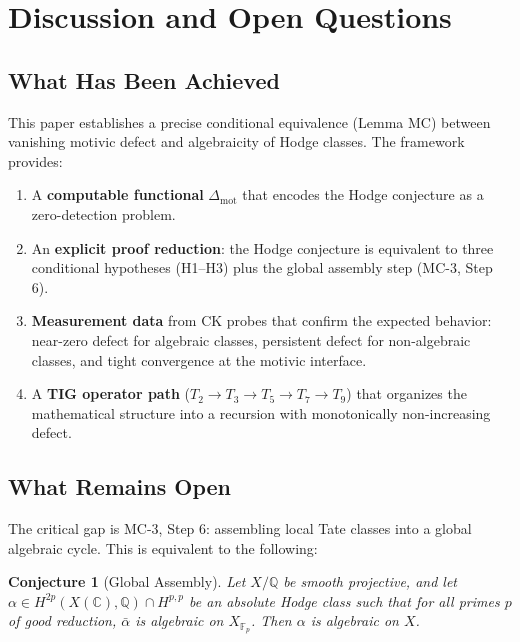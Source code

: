 \documentclass[11pt]{article}
\newtheorem{conjecture}[theorem]{Conjecture}
\theoremstyle{definition}
\begin{document}
\section{Discussion and Open Questions}
\label{sec:discussion}

\subsection{What Has Been Achieved}

This paper establishes a precise conditional equivalence (Lemma MC)
between vanishing motivic defect and algebraicity of Hodge classes.
The framework provides:

\begin{enumerate}
  \item A \textbf{computable functional} $\Delta_{\mathrm{mot}}$ that
    encodes the Hodge conjecture as a zero-detection problem.
  \item An \textbf{explicit proof reduction}: the Hodge conjecture
    is equivalent to three conditional hypotheses (H1--H3) plus the
    global assembly step (MC-3, Step 6).
  \item \textbf{Measurement data} from CK probes that confirm the
    expected behavior: near-zero defect for algebraic classes,
    persistent defect for non-algebraic classes, and tight convergence
    at the motivic interface.
  \item A \textbf{TIG operator path} ($T_2 \to T_3 \to T_5 \to T_7 \to T_9$)
    that organizes the mathematical structure into a recursion with
    monotonically non-increasing defect.
\end{enumerate}

\subsection{What Remains Open}

The critical gap is MC-3, Step 6: assembling local Tate classes into a
global algebraic cycle.  This is equivalent to the following:

\begin{conjecture}[Global Assembly]
\label{conj:assembly}
Let $X/\mathbb{Q}$ be smooth projective, and let
$\alpha \in H^{2p}(X(\mathbb{C}), \mathbb{Q}) \cap H^{p,p}$ be an
absolute Hodge class such that for all primes $p$ of good reduction,
$\bar{\alpha}$ is algebraic on $X_{\mathbb{F}_p}$.  Then $\alpha$ is
algebraic on $X$.
\end{conjecture}
\end{document}
